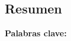 \begin{otherlanguage}{spanish}
{}
\chapter*{Resumen}

\lipsum[1-2]

\vspace{1cm}

\textbf{Palabras clave:} \keywordsEs

\vfill
\end{otherlanguage}
